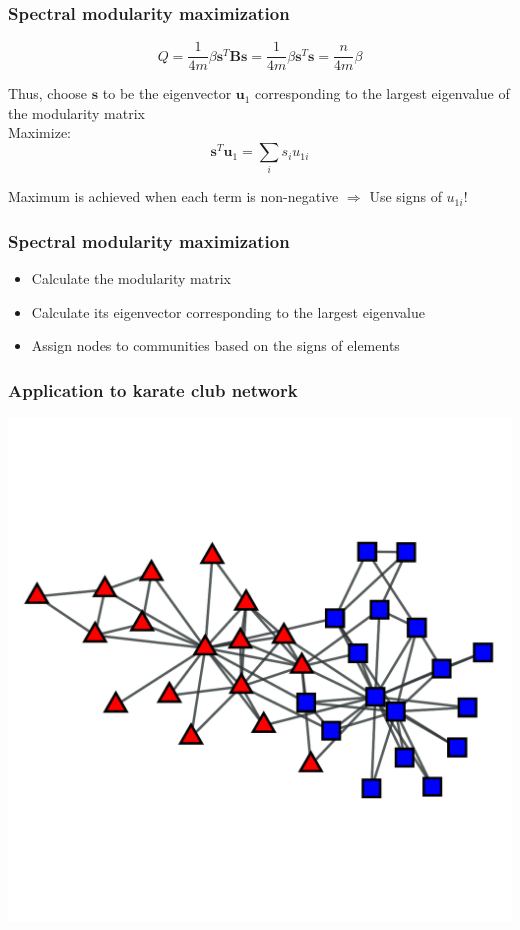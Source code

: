 \documentclass{beamer}
\begin{document}
\begin{frame}
    \frametitle{Spectral modularity maximization}
    \centering
$$Q = \frac{1}{4m}\beta{\mathbf s}^T{\mathbf B}{\mathbf s} = \frac{1}{4m}\beta {\mathbf s}^T{\mathbf s} = \frac{n}{4m}\beta$$

Thus, choose ${\mathbf s}$ to be the eigenvector ${\mathbf u_1}$ corresponding to the largest eigenvalue of the modularity matrix\\

Maximize:
$${\mathbf s}^T{\mathbf u}_1 = \sum\limits_is_iu_{1i}$$

Maximum is achieved when each term is non-negative $\Rightarrow$ Use signs of $u_{1i}$!

\end{frame}
\begin{frame}
    \frametitle{Spectral modularity maximization}
    \centering
    \begin{itemize}
    \setlength\itemsep{1em}
        \item{Calculate the modularity matrix}
        \item{Calculate its eigenvector corresponding to the largest eigenvalue}
        \item{Assign nodes to communities based on the signs of elements}
    \end{itemize}
\end{frame}
\begin{frame}
    \frametitle{Application to karate club network}
    \centering
    \includegraphics[width=0.8\columnwidth]{karate_actual.pdf}
\end{frame}
\end{document}
